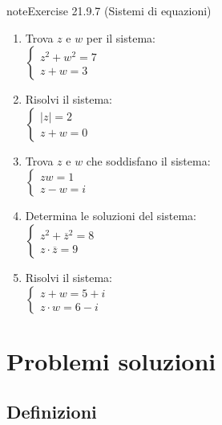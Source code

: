 \documentclass[letterpaper,10pt,italian]{jupyterBook}
\begin{document}
\begin{sphinxadmonition}{note}{Exercise 21.9.7 (Sistemi di equazioni)}
\begin{enumerate}
\item {} 
\sphinxAtStartPar
Trova \(z\) e \(w\) per il sistema:\\
\(\begin{cases} 
z^2 + w^2 = 7 \\
z + w = 3 
\end{cases}\)

\item {} 
\sphinxAtStartPar
Risolvi il sistema:\\
\(\begin{cases} 
|z| = 2 \\
z + w = 0 
\end{cases}\)

\item {} 
\sphinxAtStartPar
Trova \(z\) e \(w\) che soddisfano il sistema:\\
\(\begin{cases} 
z w = 1 \\
z - w = i 
\end{cases}\)

\item {} 
\sphinxAtStartPar
Determina le soluzioni del sistema:\\
\(\begin{cases} 
z^2 + \overline{z}^2 = 8 \\
z \cdot \overline{z} = 9 
\end{cases}\)

\item {} 
\sphinxAtStartPar
Risolvi il sistema:\\
\(\begin{cases} 
z + w = 5 + i \\
z \cdot w = 6 - i 
\end{cases}\)

\end{enumerate}
\end{sphinxadmonition}

\sphinxstepscope


\section{Problemi \sphinxhyphen{} soluzioni}
\label{\detokenize{ch/algebra/complex-algebra-sol:problemi-soluzioni}}\label{\detokenize{ch/algebra/complex-algebra-sol:math-hs-algebra-complex-sol}}\label{\detokenize{ch/algebra/complex-algebra-sol::doc}}

\subsection{Definizioni}
\label{\detokenize{ch/algebra/complex-algebra-sol:definizioni}}\label{\detokenize{ch/algebra/complex-algebra-sol:math-hs-algebra-complex-sol-def}}
\end{document}
